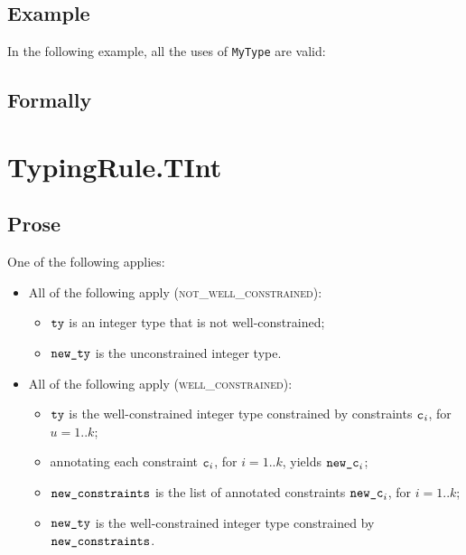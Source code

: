\subsection{Example}
In the following example, all the uses of \texttt{MyType} are valid:


\subsection{Formally}
\begin{mathpar}
\end{mathpar}


\section{TypingRule.TInt \label{sec:TypingRule.TInt}}

\subsection{Prose}
One of the following applies:
\begin{itemize}
  \item All of the following apply (\textsc{not\_well\_constrained}):
    \begin{itemize}
      \item $\tty$ is an integer type that is not well-constrained;
      \item $\newty$ is the unconstrained integer type.
    \end{itemize}
  \item All of the following apply (\textsc{well\_constrained}):
    \begin{itemize}
      \item $\tty$ is the well-constrained integer type constrained by
        constraints $\vc_i$, for $u=1..k$;
      \item annotating each constraint $\vc_i$, for $i=1..k$,
      yields $\newc_i$\ProseOrTypeError;
      \item $\newconstraints$ is the list of annotated constraints $\newc_i$,
      for $i=1..k$;
      \item $\newty$ is the well-constrained integer type constrained
        by $\newconstraints$.
    \end{itemize}
\end{itemize}

